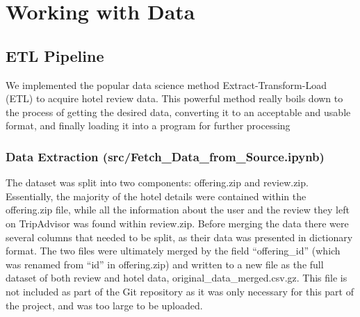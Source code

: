 \documentclass[conference]{IEEEtran}
\begin{document}
	\section{Working with Data}
	
	\subsection{ETL Pipeline}
	
	We implemented the popular data science method Extract-Transform-Load (ETL) to acquire hotel review data. This powerful method really boils down to the process of getting the desired data, converting it to an acceptable and usable format, and finally loading it into a program for further processing
	
	\subsubsection{Data Extraction (src/Fetch\_Data\_from\_Source.ipynb)}
	The dataset was split into two components: offering.zip and review.zip. Essentially, the majority of the hotel details were contained within the offering.zip file, while all the information about the user and the review they left on TripAdvisor was found within review.zip. Before merging the data there were several columns that needed to be split, as their data was presented in dictionary format. The two files were ultimately merged by the field “offering\_id” (which was renamed from “id” in offering.zip) and written to a new file as the full dataset of both review and hotel data, original\_data\_merged.csv.gz. This file is not included as part of the Git repository as it was only necessary for this part of the project, and was too large to be uploaded.
	
\end{document}
